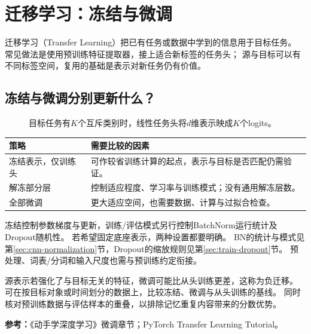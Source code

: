 \chapter{迁移学习：冻结与微调}
\label{ch:transfer}

迁移学习（Transfer Learning）把已有任务或数据中学到的信息用于目标任务。
常见做法是使用预训练特征提取器，接上适合新标签的任务头；
源与目标可以有不同标签空间，复用的基础是表示对新任务仍有价值。

\section{冻结与微调分别更新什么？}
\label{sec:transfer-freeze}
\begin{figure}[htbp]
\centering
\caption{目标任务有$K$个互斥类别时，线性任务头将$d$维表示映成$K$个logits。}
\par\smallskip
{}
\end{figure}

\begin{center}
\begin{tabularx}{\textwidth}{P{31mm}Y}
\toprule
策略 & 需要比较的因素\\
\midrule
冻结表示，仅训练头 & 可作较省训练计算的起点，表示与目标是否匹配仍需验证。\\
解冻部分层 & 控制适应程度、学习率与训练模式；没有通用解冻层数。\\
全部微调 & 更大适应空间，也需要数据、计算与过拟合检查。\\
\bottomrule
\end{tabularx}
\end{center}

冻结控制参数梯度与更新，训练/评估模式另行控制BatchNorm运行统计及Dropout随机性。
若希望固定底座表示，两种设置都要明确。
BN的统计与模式见第\ref{sec:cnn-normalization}节，Dropout的缩放规则见第\ref{sec:train-dropout}节。
预处理、词表/分词和输入尺度也需与预训练约定衔接。

\begin{pitfall}[来源匹配与评估重叠]
源表示若强化了与目标无关的特征，微调可能比从头训练更差，这称为负迁移。
可在按目标对象或时间划分的数据上，比较冻结、微调与从头训练的基线。
同时核对预训练数据与评估样本的重叠，以排除记忆重复内容带来的分数优势。
\end{pitfall}


\begingroup\small
\noindent\textbf{参考：}《动手学深度学习》微调章节；PyTorch Transfer Learning Tutorial。
\par\endgroup
